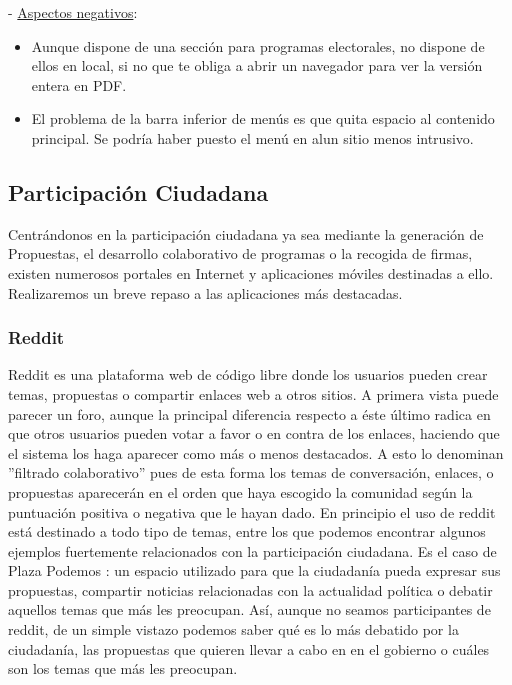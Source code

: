  - \underline{Aspectos negativos}:

\begin{itemize}
	\item Aunque dispone de una sección para programas electorales, no dispone de ellos en local, si no que te obliga a abrir un navegador para ver la versión entera en PDF.
	\item El problema de la barra inferior de menús es que quita espacio al contenido principal. Se podría haber puesto el menú en alun sitio menos intrusivo.
\end{itemize}

\subsection{Participación Ciudadana} \label{ssec:artProposals}

Centrándonos en la participación ciudadana ya sea mediante la generación de Propuestas, el desarrollo colaborativo de programas o la recogida de firmas, existen numerosos portales en Internet y aplicaciones móviles destinadas a ello. Realizaremos un breve repaso a las aplicaciones más destacadas.

\subsubsection{Reddit}

Reddit \cite{ref:reddit} es una plataforma web de código libre donde los usuarios pueden crear temas, propuestas o compartir enlaces web a otros sitios. A primera vista puede parecer un foro, aunque la principal diferencia respecto a éste último radica en que otros usuarios pueden votar a favor o en contra de los enlaces, haciendo que el sistema los haga aparecer como más o menos destacados. A esto lo denominan ''filtrado colaborativo'' pues de esta forma los temas de conversación, enlaces, o propuestas aparecerán en el orden que haya escogido la comunidad según la puntuación positiva o negativa que le hayan dado. 
En principio el uso de reddit está destinado a todo tipo de temas, entre los que podemos encontrar algunos ejemplos fuertemente relacionados con la participación ciudadana. Es el caso de Plaza Podemos \cite{ref:plazaPodemos}: un espacio utilizado para que la ciudadanía pueda expresar sus propuestas, compartir noticias relacionadas con la actualidad política o debatir aquellos temas que más les preocupan. Así, aunque no seamos participantes de reddit, de un simple vistazo podemos saber qué es lo más debatido por la ciudadanía, las propuestas que quieren llevar a cabo en en el gobierno o cuáles son los temas que más les preocupan.

